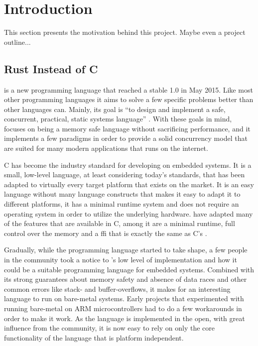 
\chapter{Introduction}
\label{chap:intro}

This section presents the motivation behind this project.
Maybe even a project outline...

\section{Rust Instead of C} %
\label{sec:intro:rust_as_replacement_to_c}

{\rust} is a new programming language that reached a stable 1.0 in May 2015.
Like most other programming languages it aims to solve a few specific problems better than other languages can.
Mainly, its goal is ``to design and implement a safe, concurrent, practical, static systems language'' \cite{web:rust_faq}.
With these goals in mind, {\rust} focuses on being a memory safe language without sacrificing performance, and it implements a few paradigms in order to provide a solid concurrency model that are suited for many modern applications that runs on the internet.

C has become the industry standard for developing on embedded systems.
It is a small, low-level language, at least considering today's standards, that has been adapted to virtually every target platform that exists on the market.
It is an easy language without many language constructs that makes it easy to adapt it to different platforms, it has a minimal runtime system and does not require an operating system in order to utilize the underlying hardware.
{\rust} have adapted many of the features that are available in C, among it are a minimal runtime, full control over the memory and a \gls{ffi} that is exactly the same as C's \cite{web:rust_once_run_everywhere}.

Gradually, while the {\rust} programming language started to take shape, a few people in the community took a notice to {\rust}'s low level of implementation and how it could be a suitable programming language for embedded systems.
Combined with its strong guarantees about memory safety and absence of data races and other common errors like stack- and buffer-overflows, it makes for an interesting language to run on bare-metal systems.
Early projects that experimented with running {\rust} bare-metal on ARM microcontrollers had to do a few workarounds in order to make it work.
As the language is implemented in the open, with great influence from the community, it is now easy to rely on only the core functionality of the language that is platform independent.

